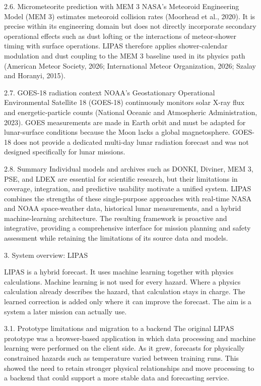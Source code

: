 2.6. Micrometeorite prediction with MEM 3 NASA's Meteoroid Engineering Model (MEM 3) estimates meteoroid collision rates (Moorhead et al., 2020). It is precise within its engineering domain but does not directly incorporate secondary operational effects such as dust lofting or the interactions of meteor-shower timing with surface operations. LIPAS therefore applies shower-calendar modulation and dust coupling to the MEM 3 baseline used in its physics path (American Meteor Society, 2026; International Meteor Organization, 2026; Szalay and Horanyi, 2015).

2.7. GOES-18 radiation context NOAA's Geostationary Operational Environmental Satellite 18 (GOES-18) continuously monitors solar X-ray flux and energetic-particle counts (National Oceanic and Atmospheric Administration, 2023). GOES measurements are made in Earth orbit and must be adapted for lunar-surface conditions because the Moon lacks a global magnetosphere. GOES-18 does not provide a dedicated multi-day lunar radiation forecast and was not designed specifically for lunar missions.

2.8. Summary Individual models and archives such as DONKI, Diviner, MEM 3, PSE, and LDEX are essential for scientific research, but their limitations in coverage, integration, and predictive usability motivate a unified system. LIPAS combines the strengths of these single-purpose approaches with real-time NASA and NOAA space-weather data, historical lunar measurements, and a hybrid machine-learning architecture. The resulting framework is proactive and integrative, providing a comprehensive interface for mission planning and safety assessment while retaining the limitations of its source data and models.

3. System overview: LIPAS

LIPAS is a hybrid forecast. It uses machine learning together with physics calculations. Machine learning is not used for every hazard. Where a physics calculation already describes the hazard, that calculation stays in charge. The learned correction is added only where it can improve the forecast. The aim is a system a later mission can actually use.

3.1. Prototype limitations and migration to a backend The original LIPAS prototype was a browser-based application in which data processing and machine learning were performed on the client side. As it grew, forecasts for physically constrained hazards such as temperature varied between training runs. This showed the need to retain stronger physical relationships and move processing to a backend that could support a more stable data and forecasting service.

